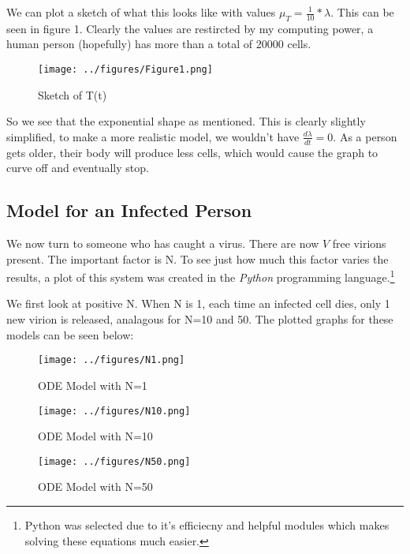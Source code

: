 We can plot a sketch of what this looks like with values $\mu_T = \frac{1}{10}* \lambda$. This can be seen in figure 1. Clearly the values are restircted by my computing power, a human person (hopefully) has more than a total of 20000 cells.

\begin{figure}[t]
    \centering
    \texttt{[image: ../figures/Figure1.png]}
    \caption{Sketch of T(t)}
\end{figure}

\newpage

So we see that the exponential shape as mentioned. This is clearly slightly simplified, to make a more realistic model, we wouldn't have $\frac{d \lambda}{dt} = 0$. As a person gets older, their body will produce less cells, which would cause the graph to curve off and eventually stop. 

\subsection{Model for an Infected Person}
We now turn to someone who has caught a virus. There are now $V$ free virions present. The important factor is N. To see just how much this factor varies the results, a plot of this system was created in the \textit{Python} programming language.\footnote{Python was selected due to it's efficiecny and helpful modules which makes solving these equations much easier.}

We first look at positive N. When N is 1, each time an infected cell dies, only 1 new virion is released, analagous for N=10 and 50. The plotted graphs for these models can be seen below:

\begin{figure}[h]
    \centering
    \begin{minipage}[b]{0.4\textwidth}
        \texttt{[image: ../figures/N1.png]}
        \caption{ODE Model with N=1}%
    \end{minipage}
    \hfill
    \centering
    \begin{minipage}[b] {0.4\textwidth}   
        \texttt{[image: ../figures/N10.png]}
        \caption{ODE Model with N=10}%
    \end{minipage}
\end{figure}

\begin{figure}[t]
    \centering
    \texttt{[image: ../figures/N50.png]}
    \caption{ODE Model with N=50}%
\end{figure}

